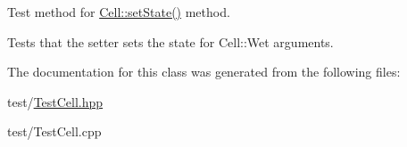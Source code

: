 Test method for \hyperlink{class_cell_ac388ff95a4d94da1497847ead859f258}{Cell\+::set\+State()} method. 

Tests that the setter sets the state for Cell\+::\+Wet arguments. 

The documentation for this class was generated from the following files\+:\begin{DoxyCompactItemize}
\item 
test/\hyperlink{_test_cell_8hpp}{Test\+Cell.\+hpp}\item 
test/Test\+Cell.\+cpp\end{DoxyCompactItemize}
